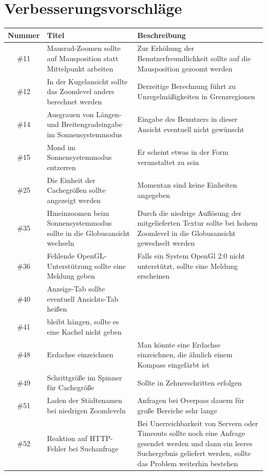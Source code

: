 \documentclass[10pt]{scrreprt}
\newcommand{\JoglEarth}{\raisebox{-1.2mm}{\texttt{[image: Logo-Text.eps]}} }
\begin{document}
\section{Verbesserungsvorschläge}
\begin{longtable}{|c|p{5.2cm}|p{8.2cm}|}
\hline
Nummer & Titel & Beschreibung \\
\hline
\hline
\#11 & Mausrad-Zoomen sollte auf Mausposition statt Mittelpunkt arbeiten & Zur Erhöhung der Benutzerfreundlichkeit sollte auf die Mausposition gezoomt werden \\
\hline
\#12 & In der Kugelansicht sollte das Zoomlevel anders berechnet werden & Derzeitige Berechnung führt zu Unregelmäßigkeiten in Grenzregionen \\
\hline
\#14 & Ausgrauen von Längen- und Breitengradeingabe im Sonnensystemmodus & Eingabe des Benutzers in dieser Ansicht eventuell nicht gewünscht \\
\hline
\#15 & Mond im Sonnensystemmodus entzerren & Er scheint etwas in der Form verunstaltet zu sein \\
\hline
\#25 & Die Einheit der Cachegrößen sollte angezeigt werden & Momentan sind keine Einheiten angegeben \\
\hline
\#35 & Hineinzoomen beim Sonnensystemmodus sollte in die Globusansicht wechseln & Durch die niedrige Auflösung der mitgelieferten Textur sollte bei hohem Zoomlevel in die Globusansicht gewechselt werden \\
\hline
\#36 & Fehlende OpenGL-Unterstützung sollte eine Meldung geben & Falls ein System OpenGl 2.0 nicht unterstützt, sollte eine Meldung erscheinen \\
\hline
\#40 & Anzeige-Tab sollte eventuell Ansichts-Tab heißen & \\
\hline
\#41 & \JoglEarth bleibt hängen, sollte es eine Kachel nicht geben & \\
\hline
\#48 & Erdachse einzeichnen & Man könnte eine Erdachse einzeichnen, die ähnlich einem Kompass eingefärbt ist \\
\hline
\#49 & Schrittgröße im Spinner für Cachegröße &
Sollte in Zehnerschritten erfolgen \\
\hline
\#51 & Laden der Städtenamen bei niedrigen Zoomleveln & Anfragen bei Overpass dauern für große Bereiche sehr lange \\
\hline
\#52 & Reaktion auf HTTP-Fehler bei Suchanfrage & Bei Unerreichbarkeit von Servern oder Timeouts sollte noch eine Anfrage gesendet werden und dann ein leeres Suchergebnis geliefert werden, sollte das Problem weiterhin bestehen \\

\end{longtable}
\end{document}

